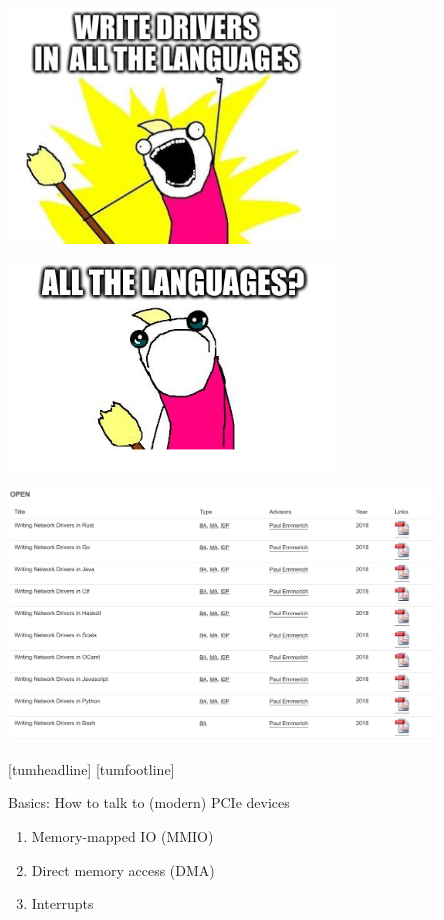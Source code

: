 \documentclass[NET,english,aspectratio=169,notitleframe]{tumbeamer}
\begin{document}
\begin{frame}{}
\centering\includegraphics[width=0.65\textwidth]{pics/allthe1}
\end{frame}

\begin{frame}{}
\centering\includegraphics[width=0.65\textwidth]{pics/allthe2}
\end{frame}

\begin{frame}{}
\centering\includegraphics[width=0.85\textwidth]{pics/theses}
\end{frame}
[tumheadline]
[tumfootline]


\begin{frame}{Basics: How to talk to (modern) PCIe devices}
\begin{enumerate}
\item Memory-mapped IO (MMIO)
\item Direct memory access (DMA)
\item Interrupts
\end{enumerate}
\end{frame}
\end{document}
